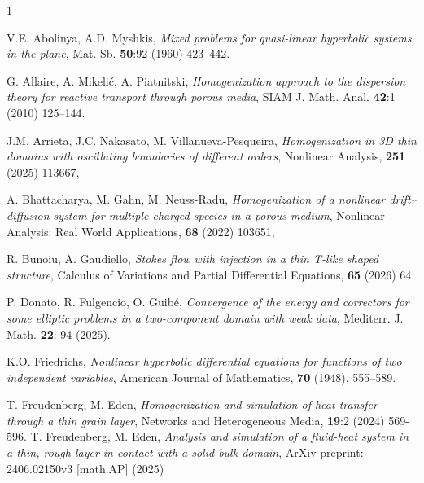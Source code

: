 \documentclass[reqno]{amsart}            %
\numberwithin{equation}{section}
\begin{document}
		
	\begin{thebibliography}{1}
		
		
		{ V.E. Abolinya,  A.D. Myshkis}, \textit{Mixed problems for quasi-linear hyperbolic systems in the plane}, Mat. Sb. \textbf{50}:92 (1960) 423--442.
		
		{G. Allaire, A. Mikeli\'{c}, A. Piatnitski},
		\textit{Homogenization approach to the dispersion theory for reactive
			transport through porous media},
		SIAM J. Math. Anal. \textbf{42}:1 (2010) 125--144.
		
		
		
		
		J.M. Arrieta, J.C. Nakasato, M. Villanueva-Pesqueira,
		\textit{Homogenization in 3D thin domains with oscillating boundaries of different orders},
		Nonlinear Analysis, \textbf{251} (2025) 113667,
		
		
		A. Bhattacharya, M. Gahn, M. Neuss-Radu, \textit{Homogenization of a nonlinear drift–diffusion system for multiple charged species in a porous medium}, Nonlinear Analysis: Real World Applications,
		\textbf{68} (2022) 103651,
		
		R. Bunoiu, A. Gaudiello, \textit{Stokes flow with injection in a thin T-like
			shaped structure}, Calculus of Variations and Partial Differential
		Equations, \textbf{65} (2026) 64. 
		
		P. Donato, R. Fulgencio, O. Guibé, \textit{Convergence of the energy and correctors for some elliptic problems in a two-component domain with weak data}, Mediterr. J. Math. \textbf{22}: 94 (2025). 
		
		
		K.O. Friedrichs, \textit{Nonlinear hyperbolic differential equations for functions of two independent variables},
		American Journal of Mathematics, \textbf{70} (1948),  555--589.
		
		T. Freudenberg, M. Eden, \textit{Homogenization and simulation of heat transfer through a thin grain layer}, Networks and Heterogeneous Media, \textbf{19}:2 (2024) 569-596. 
		T. Freudenberg, M. Eden, \textit{Analysis and simulation of a fluid-heat system in a thin, rough layer in contact with a solid 
			bulk domain}, ArXiv-preprint: 2406.02150v3 [math.AP] (2025)
		

\end{thebibliography}
\end{document}
